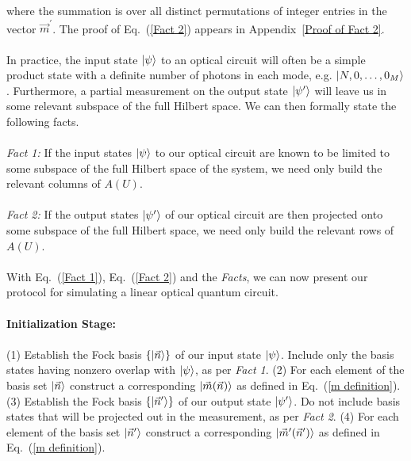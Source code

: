 \documentclass[aps,pra,twocolumn,superscriptaddress,floatfix,10pt]{revtex4}
\begin{document}
where the summation is over all distinct permutations of integer entries in the vector $\vec{m}^\prime$. The proof of Eq.~(\ref{Fact 2}) appears in Appendix~\ref{Proof of Fact 2}.
\\
\\
\indent In practice, the input state $\ket{\psi}$ to an optical circuit  will often be a simple product state with a definite number of photons in each mode, e.g. $\ket{N,0,\dots,0_M}$. Furthermore, a partial measurement on the output state $\ket{\psi^\prime}$ will leave us in some relevant subspace of the full Hilbert space. We can then formally state the following facts.
\\
\\
\textit{Fact 1:} If the input states $\ket{\psi}$ to our optical circuit are known to be limited to some subspace of the full Hilbert space of the system, we need only build the relevant columns of $A(U)$.
\\
\\
\textit{Fact 2:} If the output states $\ket{\psi^\prime}$ of our optical circuit  are then projected onto some subspace of the full Hilbert space, we need only build the relevant rows of $A(U)$.
\\
\\ \indent
With Eq.~(\ref{Fact 1}), Eq.~(\ref{Fact 2}) and the \textit{Facts}, we can now present our protocol for simulating a linear optical quantum circuit.
\\
\\
\textbf{Initialization Stage:}
\\
\\ 
		(1)  Establish the Fock basis $\{\ket{\vec{n}} \}$ of our input state $\ket{\psi}$.  Include only the basis states having nonzero overlap with $\ket{\psi}$, as per \textit{Fact 1}.
		\newline
		\newline
		(2) For each element of the basis set $\ket{\vec{n}}$ construct a corresponding $\ket{\vec{m}(\vec{n})}$ as defined in Eq.~(\ref{m definition}).
		\newline
		\newline
		(3) Establish the Fock basis $\{\ket{\vec{n}^\prime}\}$ of our output state $\ket{\psi^\prime}$. Do not include basis states that will be projected out in the measurement, as per \textit{Fact 2}.
		\newline
		\newline
		(4)  For each element of the basis set $\ket{\vec{n}^\prime}$ construct a corresponding $\ket{\vec{m}^\prime(\vec{n}^\prime)}$ as defined in Eq.~(\ref{m definition}).
\end{document}
